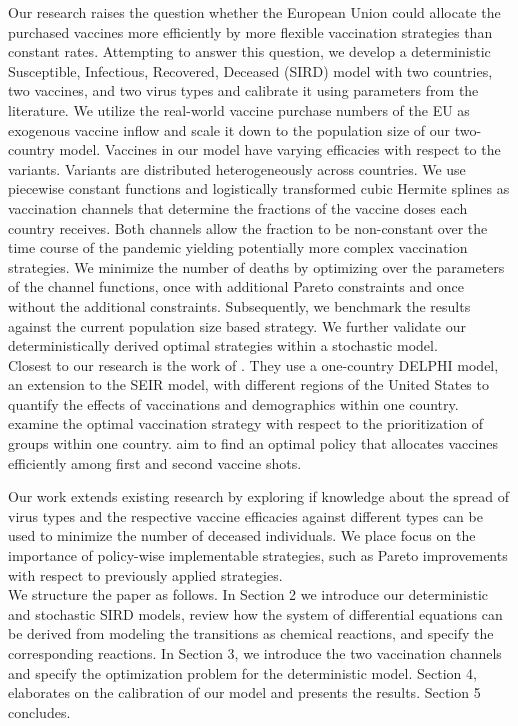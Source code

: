 Our research raises the question whether the European Union could allocate the purchased vaccines more efficiently by more flexible vaccination strategies than constant rates. Attempting to answer this question, we develop a deterministic Susceptible, Infectious, Recovered, Deceased (SIRD) model with two countries, two vaccines, and two virus types and calibrate it using parameters from the literature. We utilize the real-world vaccine purchase numbers of the EU as exogenous vaccine inflow and scale it down to the population size of our two-country model. Vaccines in our model have varying efficacies with respect to the variants. Variants are distributed heterogeneously across countries. We use piecewise constant functions and logistically transformed cubic Hermite splines as vaccination channels that determine the fractions of the vaccine doses each country receives. Both channels allow the fraction to be non-constant over the time course of the pandemic yielding potentially more complex vaccination strategies. We minimize the number of deaths by optimizing over the parameters of the channel functions, once with additional Pareto constraints and once without the additional constraints. Subsequently, we benchmark the results against the current population size based strategy. We further validate our deterministically derived optimal strategies within a stochastic model.\\


Closest to our research is the work of \cite{Bertsimas.2020}. They use a one-country DELPHI model, an extension to the SEIR model, with different regions of the United States to quantify the effects of vaccinations and demographics within one country. \cite{Matrajt.2021} examine the optimal vaccination strategy with respect to the prioritization of groups within one country. \cite{Tuite.2021} aim to find an optimal policy that allocates vaccines efficiently among first and second vaccine shots.


Our work extends existing research by exploring if knowledge about the spread of virus types and the respective vaccine efficacies against different types can be used to minimize the number of deceased individuals. We place focus on the importance of policy-wise implementable strategies, such as Pareto improvements with respect to previously applied strategies. \\

We structure the paper as follows. In Section 2 we introduce our deterministic and stochastic SIRD models, review how the system of differential equations can be derived from modeling the transitions as chemical reactions, and specify the corresponding reactions. In Section 3, we introduce the two vaccination channels and specify the optimization problem for the deterministic model. Section 4, elaborates on the calibration of our model and presents the results. Section 5 concludes. 


